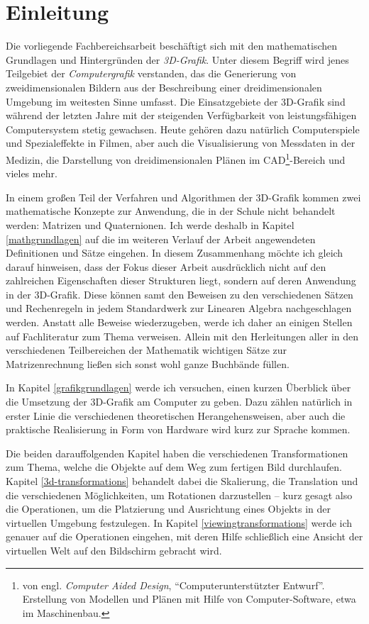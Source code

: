 \chapter{Einleitung}

Die vorliegende Fachbereichsarbeit beschäftigt sich mit den mathematischen Grundlagen und Hintergründen der \emph{3D-Grafik}. Unter diesem Begriff wird jenes Teilgebiet der \emph{Computergrafik} verstanden, das die Generierung von zweidimensionalen Bildern aus der Beschreibung einer dreidimensionalen Umgebung im weitesten Sinne umfasst. Die Einsatzgebiete der 3D-Grafik sind während der letzten Jahre mit der steigenden Verfügbarkeit von leistungsfähigen Computersystem stetig gewachsen. Heute gehören dazu natürlich Computerspiele und Spezialeffekte in Filmen, aber auch die Visualisierung von Messdaten in der Medizin, die Darstellung von dreidimensionalen Plänen im CAD\footnote{von engl. \emph{Computer Aided Design}, \enquote{Computerunterstützter Entwurf}. Erstellung von Modellen und Plänen mit Hilfe von Computer-Software, etwa im Maschinenbau.}-Bereich und vieles mehr.

In einem großen Teil der Verfahren und Algorithmen der 3D-Grafik kommen zwei mathematische Konzepte zur Anwendung, die in der Schule nicht behandelt werden: Matrizen und Quaternionen. Ich werde deshalb in Kapitel \ref{mathgrundlagen} auf die im weiteren Verlauf der Arbeit angewendeten Definitionen und Sätze eingehen. In diesem Zusammenhang möchte ich gleich darauf hinweisen, dass der Fokus dieser Arbeit ausdrücklich nicht auf den zahlreichen Eigenschaften dieser Strukturen liegt, sondern auf deren Anwendung in der 3D-Grafik. Diese können samt den Beweisen zu den verschiedenen Sätzen und Rechenregeln in jedem Standardwerk zur Linearen Algebra nachgeschlagen werden. Anstatt alle Beweise wiederzugeben, werde ich daher an einigen Stellen auf Fachliteratur zum Thema verweisen. Allein mit den Herleitungen aller in den verschiedenen Teilbereichen der Mathematik wichtigen Sätze zur Matrizenrechnung ließen sich sonst wohl ganze Buchbände füllen.

In Kapitel \ref{grafikgrundlagen} werde ich versuchen, einen kurzen Überblick über die Umsetzung der 3D-Grafik am Computer zu geben. Dazu zählen natürlich in erster Linie die verschiedenen theoretischen Herangehensweisen, aber auch die praktische Realisierung in Form von Hardware wird kurz zur Sprache kommen.

Die beiden darauffolgenden Kapitel haben die verschiedenen Transformationen zum Thema, welche die Objekte auf dem Weg zum fertigen Bild durchlaufen. Kapitel \ref{3d-transformations} behandelt dabei die Skalierung, die Translation und die verschiedenen Möglichkeiten, um Rotationen darzustellen -- kurz gesagt also die Operationen, um die Platzierung und Ausrichtung eines Objekts in der virtuellen Umgebung festzulegen. In Kapitel \ref{viewingtransformations} werde ich genauer auf die Operationen eingehen, mit deren Hilfe schließlich eine Ansicht der virtuellen Welt auf den Bildschirm gebracht wird.

